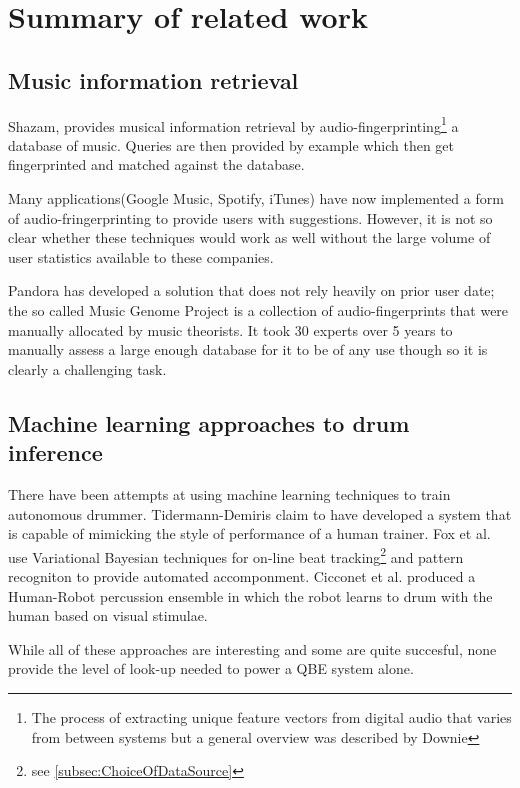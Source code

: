 \documentclass[12pt,twoside,notitlepage]{report}
\begin{document}
	
	\section{\label{sec:SummaryOfRelatedWork}Summary of related work}
	
	\subsection{Music information retrieval}	
	Shazam\cite{Shazam}, provides musical information retrieval by audio-fingerprinting\footnote{The process of extracting unique feature vectors from digital audio that varies from between systems but a general overview was described by Downie\cite{Downie2003}} a database of music. Queries are then provided by example which then get fingerprinted and matched against the database.
	
	Many applications(Google Music, Spotify, iTunes) have now implemented a form of audio-fringerprinting to provide users with suggestions. However, it is not so clear whether these techniques would work as well without the large volume of user statistics available to these companies.
	
	 Pandora has developed a solution that does not rely heavily on prior user date; the so called Music Genome Project\cite{Pandora2008} is a collection of audio-fingerprints that were manually allocated by music theorists. It took 30 experts over 5 years to manually assess a large enough database for it to be of any use though so it is clearly a challenging task.

	\subsection{Machine learning approaches to drum inference}
		There have been attempts at using machine learning techniques to train autonomous drummer. Tidermann-Demiris\cite{TidemannDemiris2008} claim to have developed a system that is capable of mimicking the style of performance of a human trainer. Fox et al.\cite{FoxRezekRoberts2007} use Variational Bayesian techniques for on-line beat tracking\footnote{see \ref{subsec:ChoiceOfDataSource}} and pattern recogniton to provide automated accomponment. Cicconet et al.\cite{BretanWeinberg2014} produced a Human-Robot percussion ensemble in which the robot learns to drum with the human based on visual stimulae.
		
		While all of these approaches are interesting and some are quite succesful, none provide the level of look-up needed to power a QBE system alone.
		
\end{document}
